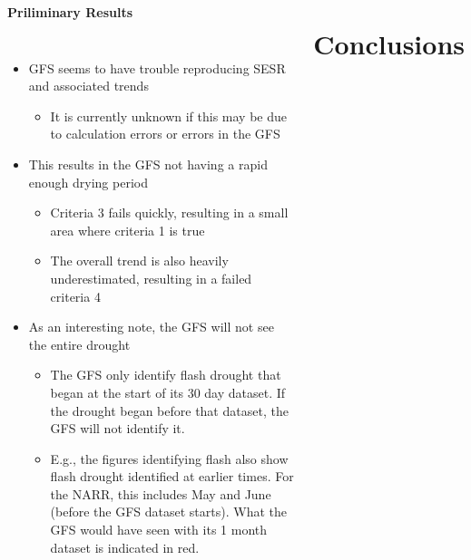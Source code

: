 \documentclass{beamer}
\begin{document}
\begin{frame}[t]{}
\begin{columns}[t]
\begin{creambox}
\begin{block}{\bfseries Priliminary Results}
\begin{columns}[t]
						
						\begin{itemize}
							\item GFS seems to have trouble reproducing SESR and associated trends
							\begin{itemize}
								\item It is currently unknown if this may be due to calculation errors or errors in the GFS
							\end{itemize}
							\item This results in the GFS not having a rapid enough drying period
							\begin{itemize}
								\item Criteria 3 fails quickly, resulting in a small area where criteria 1 is true
								\item The overall trend is also heavily underestimated, resulting in a failed criteria 4
							\end{itemize}
							\item As an interesting note, the GFS will not see the entire drought
							\begin{itemize}
								\item The GFS only identify flash drought that began at the start of its 30 day dataset. If the drought began before that dataset, the GFS will not identify it.
								\item E.g., the figures identifying flash also show flash drought identified at earlier times. For the NARR, this includes May and June  (before the GFS dataset starts). What the GFS would have seen with its 1 month dataset is indicated in red.
							\end{itemize}
						\end{itemize}
					\end{columns}
					
				\end{block}
			\end{creambox}
			
			
			\section{Conclusions} %
			

\end{columns}
\end{frame}
\end{document}
